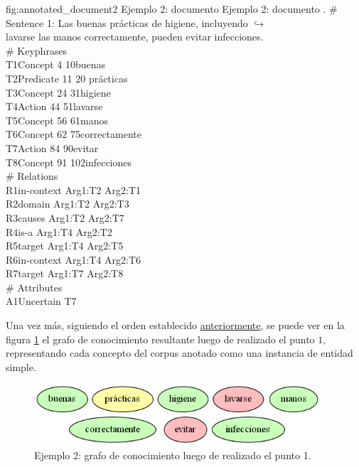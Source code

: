 \vspace{-0.2in}
\begin{annexample}
[backgroundcolor=cyan!13]
{\textwidth}
{fig:annotated_document2}
{Ejemplo 2: documento }
{Ejemplo 2: documento .}
	\# Sentence 1: Las buenas prácticas de higiene, incluyendo {\scriptsize $\hookrightarrow$}\\
	lavarse las manos correctamente, pueden evitar infecciones.\\
	\# Keyphrases\\
	T1\space\space Concept 4 10\space\space\space\space buenas\\
	T2\space\space Predicate 11 20 prácticas\\
	T3\space\space Concept 24 31\space\space\space higiene\\
	T4\space\space Action 44 51\space\space\space\space lavarse\\
	T5\space\space Concept 56 61\space\space\space manos\\
	T6\space\space Concept 62 75\space\space\space correctamente\\
	T7\space\space Action 84 90\space\space\space\space evitar\\
	T8\space\space Concept 91 102\space\space infecciones\\
	\# Relations\\
	R1\space\space in-context Arg1:T2 Arg2:T1\\
	R2\space\space domain Arg1:T2 Arg2:T3\\
	R3\space\space causes Arg1:T2 Arg2:T7\\
	R4\space\space is-a Arg1:T4 Arg2:T2\\
	R5\space\space target Arg1:T4 Arg2:T5\\
	R6\space\space in-context Arg1:T4 Arg2:T6\\
	R7\space\space target Arg1:T7 Arg2:T8\\
	\# Attributes\\
	A1\space\space Uncertain T7
\end{annexample}

Una vez más, siguiendo el orden establecido \hyperref[enum:knowledge_graph_build_order]{anteriormente}, se puede ver en la figura \ref{fig:knowledge_graph2.1} el grafo de conocimiento resultante luego de realizado el punto $1$, representando cada concepto del corpus anotado como una instancia de entidad simple.

\begin{figure}[H]
	\begin{center}
		\includegraphics[width=4.2in]{graphics/knowledge_graph_example2_1.png}
		\caption[Ejemplo 2: grafo de conocimiento luego de realizado el punto 1]{Ejemplo 2: grafo de conocimiento luego de realizado el punto 1.}
		\label{fig:knowledge_graph2.1}
	\end{center}
\end{figure}

